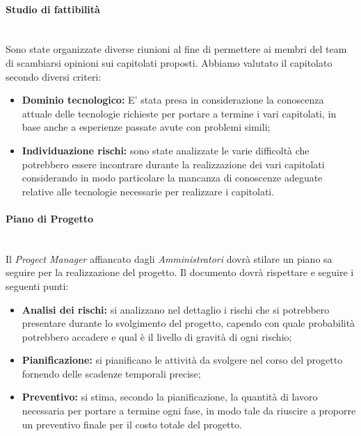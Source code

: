		\paragraph{Studio di fattibilità} \mbox{} \\
		Sono state organizzate diverse riunioni al fine di permettere ai membri del team di scambiarsi opinioni sui capitolati proposti. 
		Abbiamo valutato il capitolato secondo diversi criteri:
		\begin{itemize}
			\item \textbf{Dominio tecnologico:} E' stata presa in considerazione la conoscenza attuale delle tecnologie richieste per portare a termine i vari capitolati, in base
			anche a esperienze passate avute con problemi simili;
			\item \textbf{Individuazione rischi:} sono state analizzate le varie difficoltà che potrebbero essere incontrare durante la realizzazione dei vari capitolati considerando 
			in modo particolare la mancanza di conoscenze adeguate relative alle tecnologie necessarie per realizzare i capitolati.
		\end{itemize}  
		\paragraph{Piano di Progetto} \mbox{} \\
		Il \emph{Progect Manager} affiancato dagli \emph{Amministratori} dovrà stilare un piano sa seguire per la realizzazione del progetto.
		Il documento dovrà rispettare e seguire i seguenti punti:
		\begin{itemize}
		\item \textbf{Analisi dei rischi:} si analizzano nel dettaglio i rischi che si potrebbero presentare durante lo svolgimento del progetto, capendo con quale probabilità potrebbero accadere e qual è il livello di gravità di ogni rischio;
		\item \textbf{Pianificazione:} si pianificano le attività da svolgere nel corso del progetto fornendo delle scadenze temporali precise;
		\item \textbf{Preventivo:} si stima, secondo la pianificazione, la quantità di lavoro necessaria per portare a termine ogni fase, in modo tale da riuscire a proporre un preventivo finale per il costo totale del progetto.
		\end{itemize} 
		
